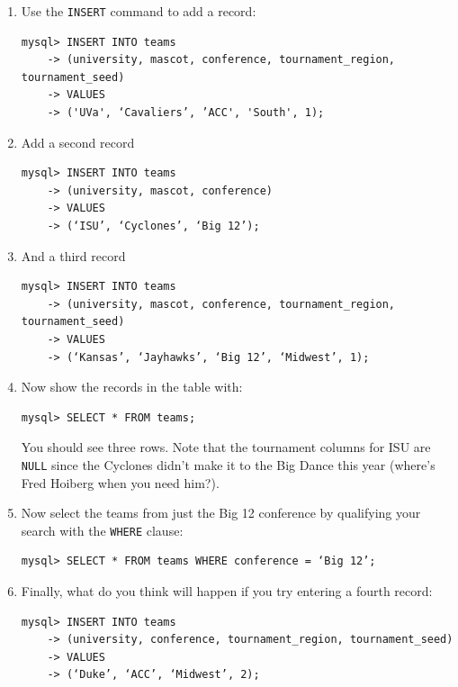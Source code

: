 \documentclass[11pt]{article} %
\begin{document}
\begin{enumerate}
\item Use the \verb|INSERT| command to add a record:
\begin{verbatim}
mysql> INSERT INTO teams
    -> (university, mascot, conference, tournament_region, tournament_seed)
    -> VALUES
    -> ('UVa', ‘Cavaliers’, ’ACC', 'South', 1);
\end{verbatim}

\item Add a second record
\begin{verbatim}
mysql> INSERT INTO teams
    -> (university, mascot, conference)
    -> VALUES
    -> (‘ISU’, ‘Cyclones’, ‘Big 12’);
\end{verbatim}

\item And a third record
\begin{verbatim}
mysql> INSERT INTO teams
    -> (university, mascot, conference, tournament_region, tournament_seed)
    -> VALUES
    -> (‘Kansas’, ‘Jayhawks’, ‘Big 12’, ‘Midwest’, 1);
\end{verbatim}

\item Now show the records in the table with:

\begin{verbatim}
mysql> SELECT * FROM teams;
\end{verbatim}

You should see three rows. Note that the tournament columns for ISU are \verb|NULL| since the Cyclones didn’t make it to the Big Dance this year (where’s Fred Hoiberg when you need him?).

\item Now select the teams from just the Big 12 conference by qualifying your search with the \verb|WHERE| clause:

\begin{verbatim}
mysql> SELECT * FROM teams WHERE conference = ‘Big 12’;
\end{verbatim}

\item Finally, what do you think will happen if you try entering a fourth record:

\begin{verbatim}
mysql> INSERT INTO teams
    -> (university, conference, tournament_region, tournament_seed)
    -> VALUES
    -> (‘Duke’, ‘ACC’, ‘Midwest’, 2);
\end{verbatim}
\end{enumerate}
\end{document}

